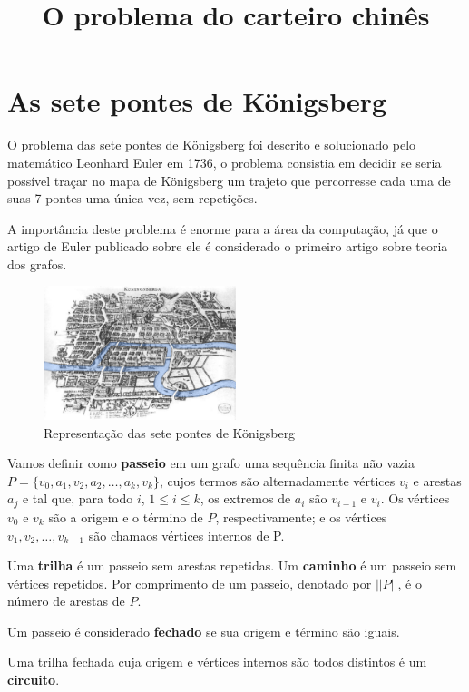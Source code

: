 \documentclass{article}
\title{O problema do carteiro chinês}
\date{}
\begin{document}
\maketitle

\section{As sete pontes de Königsberg}

O problema das sete pontes de Königsberg foi descrito e solucionado pelo matemático Leonhard Euler em 1736, o problema consistia em decidir se seria possível traçar no mapa de Königsberg um trajeto que percorresse cada uma de suas 7 pontes uma única vez, sem repetições.

A importância deste problema é enorme para a área da computação, já que o artigo de Euler publicado sobre ele é considerado o primeiro artigo sobre teoria dos grafos.

\begin{figure} 
    \centering
    \includegraphics[width=0.5\textwidth]{konigsberg.png}
    \caption{Representação das sete pontes de Königsberg}
\end{figure}

Vamos definir como \textbf{passeio} em um grafo uma sequência finita não vazia $P = \{ v_0, a_1, v_2, a_2, \dots, a_k, v_k\}$, cujos termos são alternadamente vértices $v_i$ e arestas $a_j$ e tal que, para todo $i$, $1 \leq i \leq k$, os extremos de $a_i$ são $v_{i-1}$ e $v_i$. 
Os vértices $v_0$ e $v_k$ são a origem e o término de $P$, respectivamente; e os vértices $v_1, v_2, \dots, v_{k-1}$ são chamaos vértices internos de P. 

Uma \textbf{trilha} é um passeio sem arestas repetidas. 
Um \textbf{caminho} é um passeio sem vértices repetidos.
Por comprimento de um passeio, denotado por $||P||$, é o número de arestas de $P$.

Um passeio é considerado \textbf{fechado} se sua origem e término são iguais.

Uma trilha fechada cuja origem e vértices internos são todos distintos é um \textbf{circuito}.
\end{document}

